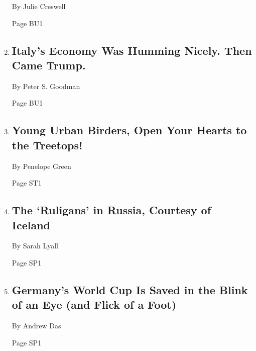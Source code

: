 \begin{enumerate}
  By Julie Creswell

  Page BU1
\item
  \href{/2018/06/22/business/italy-economy-trade-war-iran-sanctions.html}{}

  \hypertarget{italys-economy-was-humming-nicely-then-came-trump}{%
  \subsection{Italy's Economy Was Humming Nicely. Then Came
  Trump.}\label{italys-economy-was-humming-nicely-then-came-trump}}

  By Peter S. Goodman

  Page BU1
\item
  \href{/2018/06/23/style/birds-are-cool.html}{}

  \hypertarget{young-urban-birders-open-your-hearts-to-the-treetops}{%
  \subsection{Young Urban Birders, Open Your Hearts to the
  Treetops!}\label{young-urban-birders-open-your-hearts-to-the-treetops}}

  By Penelope Green

  Page ST1
\item
  \href{/2018/06/22/sports/world-cup/iceland-fans-.html}{}

  \hypertarget{the-ruligans-in-russia-courtesy-of-iceland}{%
  \subsection{The `Ruligans' in Russia, Courtesy of
  Iceland}\label{the-ruligans-in-russia-courtesy-of-iceland}}

  By Sarah Lyall

  Page SP1
\item
  \href{/2018/06/23/sports/world-cup/germany-vs-sweden.html}{}

  \hypertarget{germanys-world-cup-is-saved-in-the-blink-of-an-eye-and-flick-of-a-foot}{%
  \subsection{Germany's World Cup Is Saved in the Blink of an Eye (and
  Flick of a
  Foot)}\label{germanys-world-cup-is-saved-in-the-blink-of-an-eye-and-flick-of-a-foot}}

  By Andrew Das

  Page SP1
\end{enumerate}

